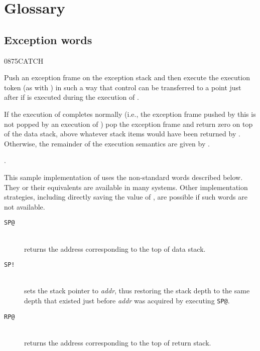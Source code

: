 \newpage
\setcounter{section}{5}
\section{Glossary} %

\subsection{Exception words} %

\begin{worddef}{0875}{CATCH}
\item {}

	Push an exception frame on the exception stack and then execute
	the execution token  (as with ) in
	such a way that control can be transferred to a point just after
	 if  is executed during the execution of
	.

	If the execution of  completes normally (i.e., the
	exception frame pushed by this  is not popped by an
	execution of ) pop the exception frame and return
	zero on top of the data stack, above whatever stack items would
	have been returned by  . Otherwise,
	the remainder of the execution semantics are given by
	.

\see {}.

	\begin{implement} %
	\dffamily
		This sample implementation of  uses the non-standard
		words described below.  They or their equivalents are available in many
		systems.  Other implementation strategies, including directly saving the
		value of , are possible if such words are not available.

		\begin{description}
		\item[\texttt{SP@}]  \\
			returns the address corresponding to the top of data stack.

		\item[\texttt{SP!}]  \\
			sets the stack pointer to \emph{addr}, thus restoring the stack
			depth to the same depth that existed just before \emph{addr} was
			acquired by executing \texttt{SP@}.

		\item[\texttt{RP@}]  \\
			returns the address corresponding to the top of return stack.


\end{description}
\end{implement}
\end{worddef}
